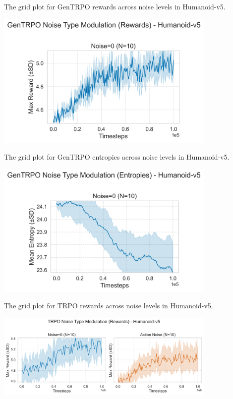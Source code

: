 \documentclass{svproc}
\begin{document}
The grid plot for GenTRPO rewards across noise levels in Humanoid-v5.

\begin{center}
\includegraphics[width=0.8\textwidth]{graph_Humanoid-v5_GenTRPO_noise_mod_rewards_grid.png}
\end{center}

The grid plot for GenTRPO entropies across noise levels in Humanoid-v5.

\begin{center}
\includegraphics[width=0.8\textwidth]{graph_Humanoid-v5_GenTRPO_noise_mod_entropies_grid.png}
\end{center}

The grid plot for TRPO rewards across noise levels in Humanoid-v5.

\begin{center}
\includegraphics[width=0.8\textwidth]{graph_Humanoid-v5_TRPO_noise_mod_rewards_grid.png}
\end{center}
\end{document}
